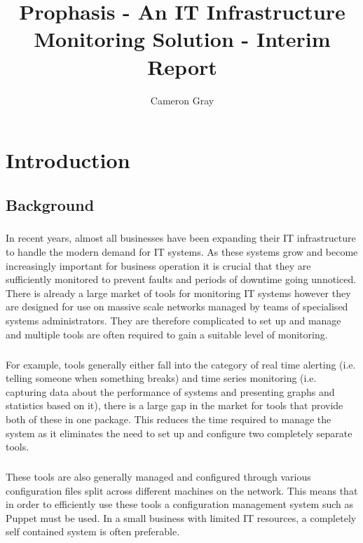 \documentclass[bsc,logo,twoside]{infthesis}
\title{Prophasis - An IT Infrastructure Monitoring Solution - Interim Report}
\author{Cameron Gray}
\begin{document}
\maketitle
\tableofcontents

\chapter{Introduction}
\section{Background}
\paragraph*{}
	In recent years, almost all businesses have been expanding their IT 
	infrastructure to handle the modern demand for IT systems.  As these systems
	grow and become increasingly important for business operation it is crucial
	that they are sufficiently monitored to prevent faults and periods of downtime
	going unnoticed.  There is already a large market of tools for monitoring
	IT systems however they are designed for use on massive scale networks managed
	by teams of specialised systems administrators.  They are therefore
	complicated to set up and manage and multiple tools are often required to gain
	a suitable level of monitoring.
	
\paragraph*{}
	For example, tools generally either fall into
	the category of real time alerting (i.e. telling someone when something
	breaks) and time series monitoring (i.e. capturing data about the performance
	of systems and presenting graphs and statistics based on it), there is a large
	gap in the market for tools that provide both of these in one package. This
	reduces the time required to manage the system as it eliminates the need to
	set up and configure two completely separate tools.

\paragraph*{}	
	These tools are also generally managed and configured through various
	configuration files split across different machines on the network. This means
	that in order to efficiently use these tools a configuration management system
	such as	Puppet must be used. In a small business with limited IT resources, a
	completely self contained system is often preferable.
\end{document}
